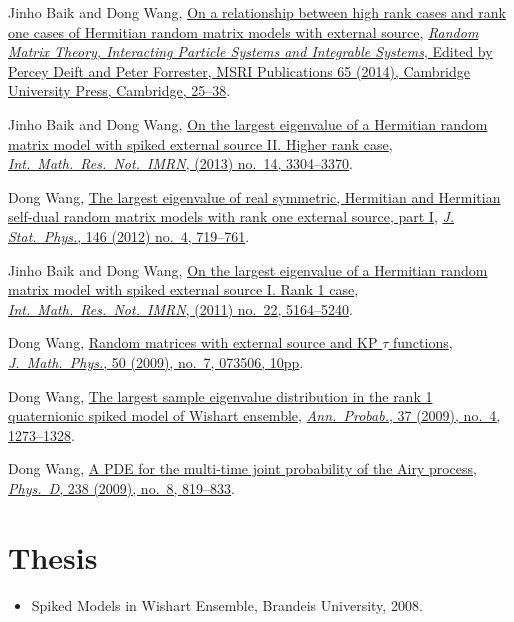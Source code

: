 \documentclass[12pt, letter]{article}
\begin{document}
\begin{etaremune}
\item Jinho Baik and Dong Wang,
  \href{http://arxiv.org/abs/1207.0389}{On a relationship between high rank cases and rank one cases of Hermitian random matrix models with external source}, \href{http://www.cambridge.org/asia/catalogue/catalogue.asp?isbn=9781107079922}{\textit{Random Matrix Theory, Interacting Particle Systems and Integrable Systems}, Edited by Percey Deift and Peter Forrester, MSRI Publications 65 (2014), Cambridge University Press, Cambridge, 25--38}.
\item Jinho Baik and Dong Wang,
  \href{http://arxiv.org/abs/1104.2915}{On the largest eigenvalue of a Hermitian random matrix model with spiked external source II. Higher rank case}, \href{https://doi.org/10.1093/imrn/rns136}{\textit{Int.\ Math.\ Res.\ Not.\ IMRN}, (2013) no.\ 14, 3304--3370}.
\item Dong Wang,
  \href{http://arxiv.org/abs/1012.4144}{The largest eigenvalue of real symmetric, Hermitian and Hermitian self-dual random matrix models with rank one external source, part I}, \href{https://doi.org/10.1007/s10955-012-0417-x}{\textit{J. Stat.\ Phys.}, 146 (2012) no.\ 4, 719--761}.
\item Jinho Baik and  Dong Wang,
  \href{http://arxiv.org/abs/1010.4604}{On the largest eigenvalue of a Hermitian random matrix model with spiked external source I. Rank 1 case}, \href{https://doi.org/10.1093/imrn/rnq257}{\textit{Int.\ Math.\ Res.\ Not.\ IMRN}, (2011) no.\ 22, 5164--5240}.
\item Dong Wang,
  \href{http://arxiv.org/abs/0810.0280}{Random matrices with external source and KP $\tau$ functions}, \href{https://doi.org/10.1063/1.3167802}{\textit{J.\ Math.\ Phys.}, 50 (2009), no.\ 7, 073506, 10pp}.
\item Dong Wang,
 \href{http://arxiv.org/abs/0711.2722}{The largest sample eigenvalue distribution in the rank 1 quaternionic spiked model of Wishart ensemble}, \href{https://doi.org/10.1214/08-AOP432}{\textit{Ann.\ Probab.}, 37 (2009), no.\ 4, 1273--1328}.
\item Dong Wang,
  \href{http://arxiv.org/abs/0711.3797}{A PDE for the multi-time joint probability of the Airy process}, \href{https://doi.org/10.1016/j.physd.2009.02.007}{\textit{Phys.\ D}, 238 (2009), no.\ 8, 819--833}.
\end{etaremune}

\section*{Thesis}

\begin{itemize}
\item
  Spiked Models in Wishart Ensemble, Brandeis University, 2008.
\end{itemize}
\end{document}
